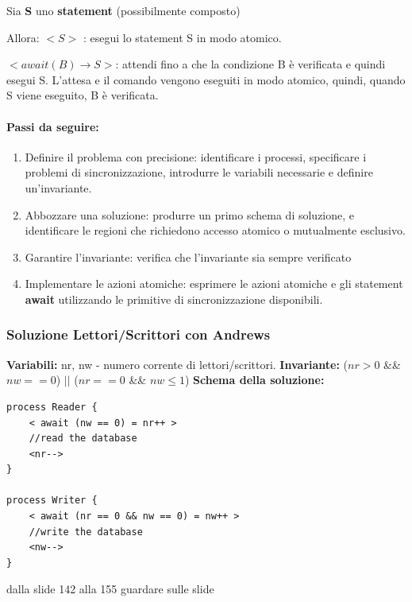Sia \textbf{S} uno \textbf{statement} (possibilmente composto)

Allora:
$< S >$ : esegui lo statement S in modo atomico.

$< await(B) \rightarrow S>$: attendi fino a che la condizione B è verificata e quindi esegui S. L'attesa e il comando vengono eseguiti in modo atomico, quindi, quando S viene eseguito, B è verificata.

\paragraph{Passi da seguire:}
\begin{enumerate}
    \item Definire il problema con precisione: identificare i processi, specificare i problemi di sincronizzazione, introdurre le variabili necessarie e definire un'invariante.
    \item Abbozzare una soluzione: produrre un primo schema di soluzione, e identificare le regioni che richiedono accesso atomico o mutualmente esclusivo.
    \item Garantire l'invariante: verifica che l'invariante sia sempre verificato
    \item Implementare le azioni atomiche: esprimere le azioni atomiche e gli statement \textbf{await} utilizzando le primitive di sincronizzazione disponibili.
\end{enumerate}

\subsubsection{Soluzione Lettori/Scrittori con Andrews}

\textbf{Variabili:} nr, nw - numero corrente di lettori/scrittori.
\newline
\textbf{Invariante:} ($nr > 0$ \&\& $nw == 0$) $||$ ($nr == 0$ \&\& $nw \le 1$)
\newline
\textbf{Schema della soluzione:}
\begin{lstlisting}
process Reader {
    < await (nw == 0) = nr++ >
    //read the database
    <nr-->
}

process Writer {
    < await (nr == 0 && nw == 0) = nw++ >
    //write the database
    <nw-->
}
\end{lstlisting}

dalla slide 142 alla 155 guardare sulle slide






